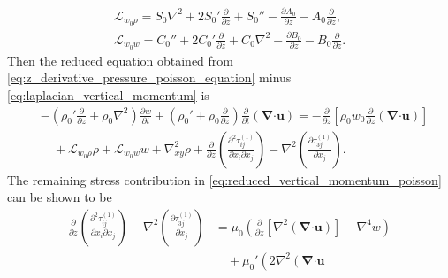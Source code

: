 \documentclass[11pt]{article}
\newcommand{\bnabla}{\boldsymbol{\nabla}}
\newcommand{\bcdot}{\boldsymbol{\cdot}}
\newenvironment{appen}{\appendix}{}
\begin{document}
\begin{appen}
\begin{subequations}\label{eq:w0_xy_operators}
\begin{gather}
  \mathscr{L}_{w_0\rho}
  =
  S_0 \nabla^2
  +
  2 S_0' \frac{\partial}{\partial z}
  +
  S_0''
  -
  \frac{\partial A_0}{\partial z}
  -
  A_0 \frac{\partial}{\partial z},
  \\
  \mathscr{L}_{w_0 w}
  =
  C_0''
  +
  2 C_0' \frac{\partial}{\partial z}
  +
  C_0 \nabla^2
  -
  \frac{\partial B_0}{\partial z}
  -
  B_0 \frac{\partial}{\partial z}.
\end{gather}
\end{subequations}
Then the reduced equation obtained from \eqref{eq:z_derivative_pressure_poisson_equation} minus \eqref{eq:laplacian_vertical_momentum} is
\begin{equation}\label{eq:reduced_vertical_momentum_poisson}
\begin{split}
  &
  -
  \left(
    \rho_0' \frac{\partial}{\partial z}
    +
    \rho_0 \nabla^2
  \right)
  \frac{\partial w}{\partial t}
  +
  \left(
    \rho_0'
    +
    \rho_0 \frac{\partial}{\partial z}
  \right)
  \frac{\partial}{\partial t}
  \left(
    \bnabla\bcdot\boldsymbol{u}
  \right)
  =
  -
  \frac{\partial}{\partial z}
  \left[
    \rho_0 w_0
    \frac{\partial}{\partial z}
    \left(
      \bnabla\bcdot\boldsymbol{u}
    \right)
  \right]
  \\
  &\quad
  +
  \mathscr{L}_{w_0\rho}\rho
  +
  \mathscr{L}_{w_0 w}w
  +
  \nabla_{xy}^2 \rho
  +
  \frac{\partial}{\partial z}
  \left(
    \frac{\partial^2 \tau_{ij}^{(1)}}{\partial x_i \partial x_j}
  \right)
  -
  \nabla^2
  \left(
    \frac{\partial \tau_{3j}^{(1)}}{\partial x_j}
  \right).
\end{split}
\end{equation}
The remaining stress contribution in \eqref{eq:reduced_vertical_momentum_poisson} can be shown to be
\begin{equation}\label{eq:stress_pressure_vertical_momentum_difference}
\begin{split}
  \frac{\partial}{\partial z}
  \left(
    \frac{\partial^2 \tau_{ij}^{(1)}}{\partial x_i \partial x_j}
  \right)
  -
  \nabla^2
  \left(
    \frac{\partial \tau_{3j}^{(1)}}{\partial x_j}
  \right)
  &=
  \mu_0
  \left(
    \frac{\partial}{\partial z}
    \left[
      \nabla^2
      \left(
        \bnabla\bcdot\boldsymbol{u}
      \right)
    \right]
    -
    \nabla^4 w
  \right)
  \\
  &\quad
  +
  \mu_0'
  \left(
    2 \nabla^2
    \left(
      \bnabla\bcdot\boldsymbol{u}

\end{split}
\end{equation}
\end{appen}
\end{document}
